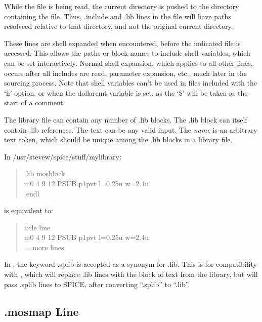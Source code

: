 While the file is being read, the current directory is pushed to the
directory containing the file.  Thus, {\vt .include} and {\vt .lib}
lines in the file will have paths resolveed relative to that
directory, and not the original current directory.

These lines are shell expanded when encountered, before the indicated
file is accessed.  This allows the paths or block names to include
shell variables, which can be set interactively.  Normal shell
expansion, which applies to all other lines, occurs after all includes
are read, parameter expansion, etc., much later in the sourcing
process.  Note that shell variables can't be used in files included
with the `{\vt h}' option, or when the {\et dollarcmt} variable is
set, as the `{\vt \$}' will be taken as the start of a comment.

The library file can contain any number of {\vt .lib} blocks.  The
{\vt .lib} block can itself contain {\vt .lib} references.  The text
can be any valid {\WRspice} input.  The {\it name} is an arbitrary text
token, which should be unique among the {\vt .lib} blocks in a library
file.


    In {\vt /usr/stevew/spice/stuff/mylibrary}:
\begin{quote}\vt
    .lib mosblock\\
    m0 4 9 12 PSUB p1pvt l=0.25u w=2.4u\\
    .endl
\end{quote}

    is equivalent to:
\begin{quote}\vt
    title line\\
    m0 4 9 12 PSUB p1pvt l=0.25u w=2.4u\\
    {\rm ... more lines}
\end{quote}

In {\WRspice}, the keyword {\vt .splib} is accepted as a synonym for
{\vt .lib}.  This is for compatibility with {\Xic}, which will replace
{\vt .lib} lines with the block of text from the library, but will
pass {\vt .splib} lines to SPICE, after converting ``{\vt .splib}'' to
``{\vt .lib}''.

\subsection{{\vt .mosmap} Line}

